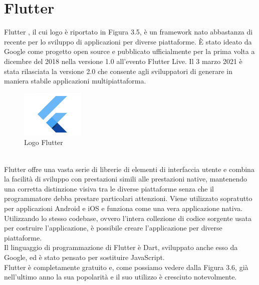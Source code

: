 \section{Flutter}
Flutter \cite{flutterprogramma,flutter,fluttermobile}, il cui logo è riportato in Figura 3.5, è un framework nato abbastanza di recente per lo sviluppo di applicazioni per diverse piattaforme.
È stato ideato da Google come progetto open source e pubblicato ufficialmente per la prima volta a dicembre del 2018 nella versione 1.0 all'evento Flutter Live.
Il 3 marzo 2021 è stata rilasciata la versione 2.0 che consente agli sviluppatori di generare in maniera stabile applicazioni multipiattaforma.
\\
\begin{figure}[htbp]	
	\centering
	\includegraphics[width=3cm]{immagini/flutterlogo.jpg}
	\caption{Logo Flutter}
	\label{fig:Logo Flutter}
\end{figure}
\\
Flutter offre una vasta serie di librerie di elementi di interfaccia utente e combina la facilità di sviluppo con prestazioni simili alle prestazioni native, mantenendo una corretta distinzione visiva tra le diverse piattaforme senza che il programmatore debba prestare particolari attenzioni.
Viene utilizzato sopratutto per applicazioni Android e iOS e funziona come una vera applicazione nativa.\\
Utilizzando lo stesso codebase, ovvero l'intera collezione di codice sorgente usata per costruire l'applicazione, è possibile creare l'applicazione per diverse piattaforme.\\
Il linguaggio di programmazione di Flutter è Dart, sviluppato anche esso da Google, ed è stato pensato per sostituire JavaScript.\\
Flutter è completamente gratuito e, come possiamo vedere dalla Figura 3.6, già nell'ultimo anno la sua popolarità e il suo utilizzo è cresciuto notevolmente.\\

